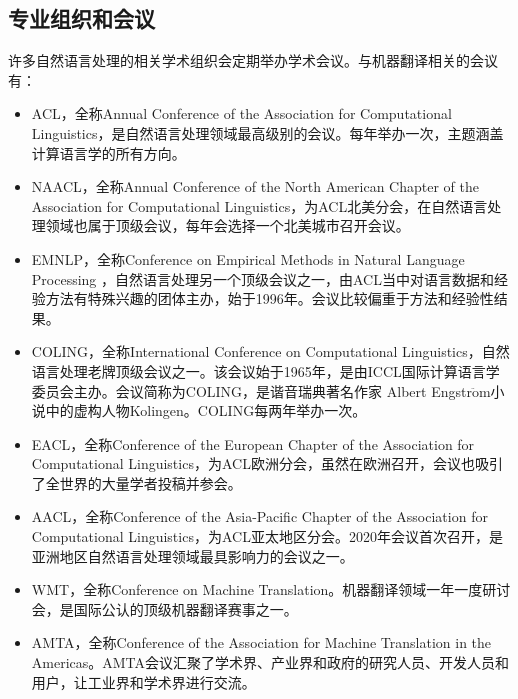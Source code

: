 \subsection{专业组织和会议}

许多自然语言处理的相关学术组织会定期举办学术会议。与机器翻译相关的会议有：

\begin{itemize}
\vspace{0.5em}
\item ACL，全称Annual Conference of the Association for Computational Linguistics，是自然语言处理领域最高级别的会议。每年举办一次，主题涵盖计算语言学的所有方向。
\vspace{0.5em}
\item NAACL，全称Annual Conference of the North American Chapter of the Association for Computational Linguistics，为ACL北美分会，在自然语言处理领域也属于顶级会议，每年会选择一个北美城市召开会议。
\vspace{0.5em}
\item EMNLP，全称Conference on Empirical Methods in Natural Language Processing ，自然语言处理另一个顶级会议之一，由ACL当中对语言数据和经验方法有特殊兴趣的团体主办，始于1996年。会议比较偏重于方法和经验性结果。
\vspace{0.5em}
\item COLING，全称International Conference on Computational Linguistics，自然语言处理老牌顶级会议之一。该会议始于1965年，是由ICCL国际计算语言学委员会主办。会议简称为COLING，是谐音瑞典著名作家 Albert Engstr$\ddot{\textrm{o}}$m小说中的虚构人物Kolingen。COLING每两年举办一次。
\vspace{0.5em}
\item EACL，全称Conference of the European Chapter of the Association for Computational Linguistics，为ACL欧洲分会，虽然在欧洲召开，会议也吸引了全世界的大量学者投稿并参会。
\vspace{0.5em}
\item AACL，全称Conference of the Asia-Pacific Chapter of the Association for Computational Linguistics，为ACL亚太地区分会。2020年会议首次召开，是亚洲地区自然语言处理领域最具影响力的会议之一。
\vspace{0.5em}
\item WMT，全称Conference on Machine Translation。机器翻译领域一年一度研讨会，是国际公认的顶级机器翻译赛事之一。
\vspace{0.5em}
\item AMTA，全称Conference of the Association for Machine Translation in the Americas。AMTA会议汇聚了学术界、产业界和政府的研究人员、开发人员和用户，让工业界和学术界进行交流。

\end{itemize}
